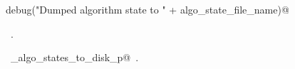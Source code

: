 \documentclass[11.5pt]{report}
\begin{document}
\begin{flushleft}
\begin{list}{}{}
\mbox{}\verb@     debug("Dumped algorithm state to " + algo_state_file_name)@\\
\mbox{}\verb@@{\NWsep}
\end{list}
\vspace{-1.5ex}
\footnotesize
\begin{list}{}{\setlength{\itemsep}{-\parsep}\setlength{\itemindent}{-\leftmargin}}
\item \NWtxtMacroRefIn\ .
\item \NWtxtIdentsUsed\nobreak\  \verb@write_algo_states_to_disk_p@\nobreak\ .
\item{}
\end{list}
\vspace{4ex}
\end{flushleft}


\vspace{-0.4cm}
\end{document}

